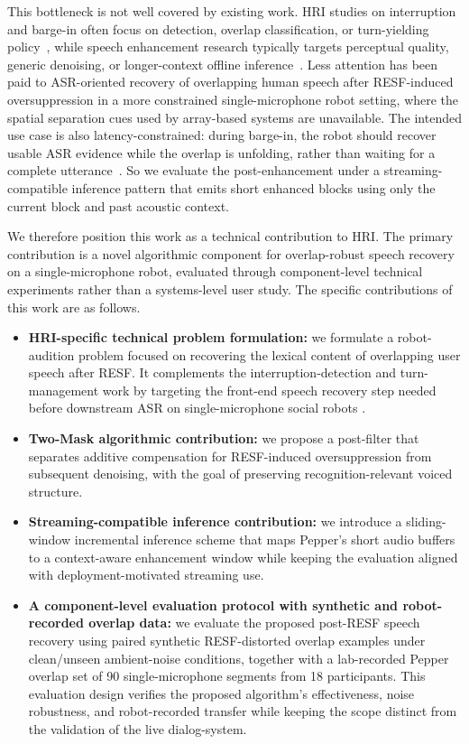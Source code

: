 \documentclass[manuscript,screen,review]{acmart}
\begin{document}
This bottleneck is not well covered by existing work. HRI studies on interruption and barge-in often focus on detection, overlap classification, or turn-yielding policy~\cite{bekal22_interspeech,selfridge2013continuously,inoue2025yeah}, while speech enhancement research typically targets perceptual quality, generic denoising, or longer-context offline inference~\cite{pascual2017segan,cao2022cmgan,fan2022real}. Less attention has been paid to ASR-oriented recovery of overlapping human speech after RESF-induced oversuppression in a more constrained single-microphone robot setting, where the spatial separation cues used by array-based systems are unavailable. The intended use case is also latency-constrained: during barge-in, the robot should recover usable ASR evidence while the overlap is unfolding, rather than waiting for a complete utterance~\cite{selfridge2013continuously}. So we evaluate the post-enhancement under a streaming-compatible inference pattern that emits short enhanced blocks using only the current block and past acoustic context.

We therefore position this work as a technical contribution to HRI. The primary contribution is a novel algorithmic component for overlap-robust speech recovery on a single-microphone robot, evaluated through component-level technical experiments rather than a systems-level user study. The specific contributions of this work are as follows.


\begin{itemize}
    \item \textbf{HRI-specific technical problem formulation:} we formulate a robot-audition problem focused on recovering the lexical content of overlapping user speech after RESF. It complements the interruption-detection and turn-management work by targeting the front-end speech recovery step needed before downstream ASR on single-microphone social robots \cite{skantze2021turn}.
    \item \textbf{Two-Mask algorithmic contribution:} we propose a post-filter that separates additive compensation for RESF-induced oversuppression from subsequent denoising, with the goal of preserving recognition-relevant voiced structure.
    \item \textbf{Streaming-compatible inference contribution:} we introduce a sliding-window incremental inference scheme that maps Pepper's short audio buffers to a context-aware enhancement window while keeping the evaluation aligned with deployment-motivated streaming use.
    \item \textbf{A component-level evaluation protocol with synthetic and robot-recorded overlap data:} we evaluate the proposed post-RESF speech recovery using paired synthetic RESF-distorted overlap examples under clean/unseen ambient-noise conditions, together with a lab-recorded Pepper overlap set of 90 single-microphone segments from 18 participants. This evaluation design verifies the proposed algorithm's effectiveness, noise robustness, and robot-recorded transfer while keeping the scope distinct from the validation of the live dialog-system.
\end{itemize}
\end{document}
